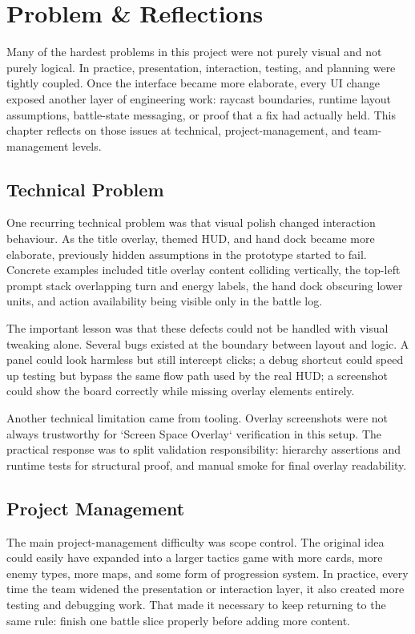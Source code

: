 \chapter{Problem \& Reflections}

Many of the hardest problems in this project were not purely visual and not purely logical. In practice, presentation, interaction, testing, and planning were tightly coupled. Once the interface became more elaborate, every UI change exposed another layer of engineering work: raycast boundaries, runtime layout assumptions, battle-state messaging, or proof that a fix had actually held. This chapter reflects on those issues at technical, project-management, and team-management levels.

\section{Technical Problem}

One recurring technical problem was that visual polish changed interaction behaviour. As the title overlay, themed HUD, and hand dock became more elaborate, previously hidden assumptions in the prototype started to fail. Concrete examples included title overlay content colliding vertically, the top-left prompt stack overlapping turn and energy labels, the hand dock obscuring lower units, and action availability being visible only in the battle log.

The important lesson was that these defects could not be handled with visual tweaking alone. Several bugs existed at the boundary between layout and logic. A panel could look harmless but still intercept clicks; a debug shortcut could speed up testing but bypass the same flow path used by the real HUD; a screenshot could show the board correctly while missing overlay elements entirely.

Another technical limitation came from tooling. Overlay screenshots were not always trustworthy for `Screen Space Overlay` verification in this setup. The practical response was to split validation responsibility: hierarchy assertions and runtime tests for structural proof, and manual smoke for final overlay readability.

\section{Project Management}

The main project-management difficulty was scope control. The original idea could easily have expanded into a larger tactics game with more cards, more enemy types, more maps, and some form of progression system. In practice, every time the team widened the presentation or interaction layer, it also created more testing and debugging work. That made it necessary to keep returning to the same rule: finish one battle slice properly before adding more content.

